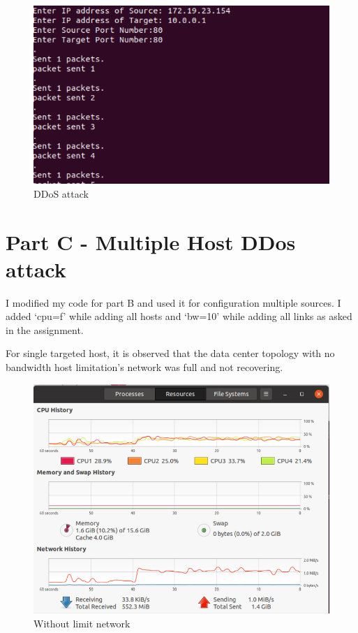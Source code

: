 \documentclass{article}
\begin{document}
\begin{figure}[ht]
\centerline{\includegraphics[scale=0.8]{partb.PNG}}
\caption{DDoS attack}
\label{fig}
\end{figure}

\section{Part C - Multiple Host DDos attack}
\label{1}
I modified my code for part B and used it for configuration multiple sources. I added ‘cpu=f’ while adding all hosts and ‘bw=10’ while adding all links as asked in the assignment. 

For single targeted host, it is observed that the data center topology with no bandwidth host limitation’s network was full and not recovering.

\begin{figure}[h]
\centerline{\includegraphics[scale=0.5]{DDOSperformance2.PNG}}
\caption{Without limit network}
\label{fig}
\end{figure}
\end{document}
